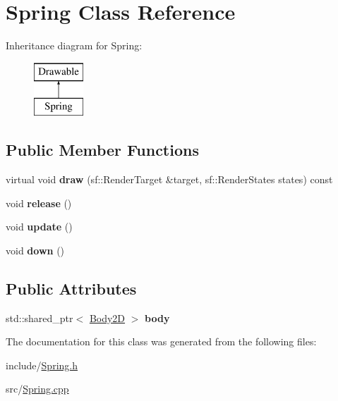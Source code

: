 \hypertarget{class_spring}{\section{Spring Class Reference}
\label{class_spring}
}
Inheritance diagram for Spring\+:\begin{figure}[H]
\begin{center}
\leavevmode
\includegraphics[height=2.000000cm]{class_spring}
\end{center}
\end{figure}
\subsection*{Public Member Functions}
\begin{DoxyCompactItemize}
\item 
\hypertarget{class_spring_aa452bf4d51b5a32834d4bca0805708a8}{virtual void {\bfseries draw} (sf\+::\+Render\+Target \&target, sf\+::\+Render\+States states) const }\label{class_spring_aa452bf4d51b5a32834d4bca0805708a8}

\item 
\hypertarget{class_spring_a8f0314e062615fd3989a2dc864096715}{void {\bfseries release} ()}\label{class_spring_a8f0314e062615fd3989a2dc864096715}

\item 
\hypertarget{class_spring_a5aa89d21be823e302129b06fb8192c2d}{void {\bfseries update} ()}\label{class_spring_a5aa89d21be823e302129b06fb8192c2d}

\item 
\hypertarget{class_spring_aa109f961a408a41608d77fda74ef8f38}{void {\bfseries down} ()}\label{class_spring_aa109f961a408a41608d77fda74ef8f38}

\end{DoxyCompactItemize}
\subsection*{Public Attributes}
\begin{DoxyCompactItemize}
\item 
\hypertarget{class_spring_aade9790be93c2eb83aae1146d24cd711}{std\+::shared\+\_\+ptr$<$ \hyperlink{class_body2_d}{Body2\+D} $>$ {\bfseries body}}\label{class_spring_aade9790be93c2eb83aae1146d24cd711}

\end{DoxyCompactItemize}


The documentation for this class was generated from the following files\+:\begin{DoxyCompactItemize}
\item 
include/\hyperlink{_spring_8h}{Spring.\+h}\item 
src/\hyperlink{_spring_8cpp}{Spring.\+cpp}\end{DoxyCompactItemize}
